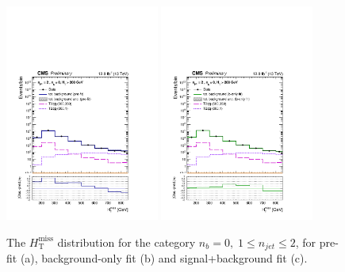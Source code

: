 \clearpage



\clearpage



\clearpage



\clearpage




\clearpage
\begin{figure}[tbhp]
    \caption{ 
    The $H_{\mathrm{T}}^{\mathrm{miss}}$ distribution for the category $n_{b}=0, \; 1 \leq n_{jet} \leq 2$, for pre-fit (a), background-only fit (b) and signal+background fit (c).
    \label{fig:mhtShape_eq0b_le2j} }
  \begin{center}
  \includegraphics[width=0.45\textwidth]{mhtShape_eq0b_le2j_200_Inf_prefit_aux} \hspace{1cm}
  \includegraphics[width=0.45\textwidth]{mhtShape_eq0b_le2j_200_Inf_fit_b_aux} \\

\end{center}
\end{figure}
